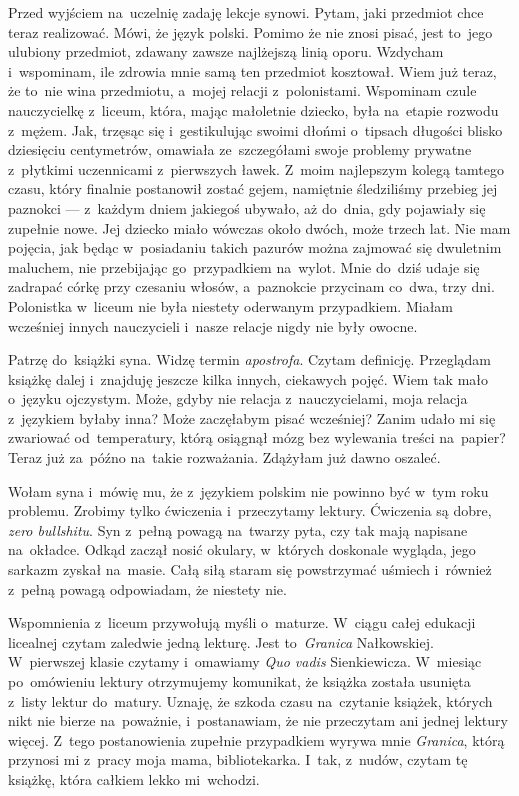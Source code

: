 \documentclass[9pt, a5paper]{memoir}
\begin{document}
Przed wyjściem na~uczelnię zadaję lekcje synowi. Pytam, jaki przedmiot chce teraz realizować. Mówi, że język polski. Pomimo że nie znosi pisać, jest to~jego ulubiony przedmiot, zdawany zawsze najlżejszą linią oporu. Wzdycham i~wspominam, ile zdrowia mnie samą ten przedmiot kosztował. Wiem już teraz, że to~nie wina przedmiotu, a~mojej relacji z~polonistami. Wspominam czule nauczycielkę z~liceum, która, mając małoletnie dziecko, była na~etapie rozwodu z~mężem. Jak, trzęsąc się i~gestikulując swoimi dłońmi o~tipsach długości blisko dziesięciu centymetrów, omawiała ze~szczegółami swoje problemy prywatne z~płytkimi uczennicami z~pierwszych ławek. Z~moim najlepszym kolegą tamtego czasu, który finalnie postanowił zostać gejem, namiętnie śledziliśmy przebieg jej paznokci --- z~każdym dniem jakiegoś ubywało, aż do~dnia, gdy pojawiały się zupełnie nowe. Jej dziecko miało wówczas około dwóch, może trzech lat. Nie mam pojęcia, jak będąc w~posiadaniu takich pazurów można zajmować się dwuletnim maluchem, nie przebijając go~przypadkiem na~wylot. Mnie do~dziś udaje się zadrapać córkę przy czesaniu włosów, a~paznokcie przycinam co~dwa, trzy dni. Polonistka w~liceum nie była niestety oderwanym przypadkiem. Miałam wcześniej innych nauczycieli i~nasze relacje nigdy nie były owocne.

Patrzę do~książki syna. Widzę termin \textit{apostrofa}. Czytam definicję. Przeglądam książkę dalej i~znajduję jeszcze kilka innych, ciekawych pojęć. Wiem tak mało o~języku ojczystym. Może, gdyby nie relacja z~nauczycielami, moja relacja z~językiem byłaby inna? Może zaczęłabym pisać wcześniej? Zanim udało mi się zwariować od~temperatury, którą osiągnął mózg bez wylewania treści na~papier? Teraz już za~późno na~takie rozważania. Zdążyłam już dawno oszaleć.

Wołam syna i~mówię mu, że z~językiem polskim nie powinno być w~tym roku problemu. Zrobimy tylko ćwiczenia i~przeczytamy lektury. Ćwiczenia są dobre, \textit{zero bullshitu}. Syn z~pełną powagą na~twarzy pyta, czy tak mają napisane na~okładce. Odkąd zaczął nosić okulary, w~których doskonale wygląda, jego sarkazm zyskał na~masie. Całą siłą staram się powstrzymać uśmiech i~również z~pełną powagą odpowiadam, że niestety nie.

Wspomnienia z~liceum przywołują myśli o~maturze. W~ciągu całej edukacji licealnej czytam zaledwie jedną lekturę. Jest to~\textit{Granica} Nałkowskiej. W~pierwszej klasie czytamy i~omawiamy \textit{Quo vadis} Sienkiewicza. W~miesiąc po~omówieniu lektury otrzymujemy komunikat, że książka została usunięta z~listy lektur do~matury. Uznaję, że szkoda czasu na~czytanie książek, których nikt nie bierze na~poważnie, i~postanawiam, że nie przeczytam ani jednej lektury więcej. Z~tego postanowienia zupełnie przypadkiem wyrywa mnie \textit{Granica}, którą przynosi mi z~pracy moja mama, bibliotekarka. I~tak, z~nudów, czytam tę książkę, która całkiem lekko mi~wchodzi.
\end{document}
